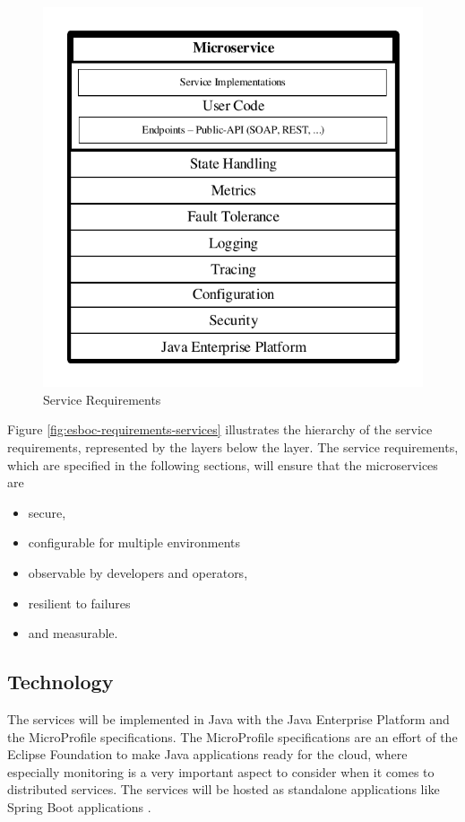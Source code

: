 \begin{figure}[htbp]
	\centering
	\includegraphics[scale=1]{images/esboc-requirement-services.pdf}
	\caption{Service Requirements}
	\label{fig:esboc-requirements-services}
\end{figure} 
Figure \vref{fig:esboc-requirements-services} illustrates the hierarchy of the service requirements, represented by the layers below the  layer. The service requirements, which are specified in the following sections, will ensure that the microservices are
\begin{itemize}
	\item secure,
	\item configurable for multiple environments
	\item observable by developers and operators,
	\item resilient to failures
	\item and measurable.
\end{itemize}

\subsection{Technology}
\label{sec:esboc-requirements-service-technology}
The services will be implemented in Java with the Java Enterprise Platform and the MicroProfile specifications. The MicroProfile specifications are an effort of the Eclipse Foundation to make Java applications ready for the cloud, where especially monitoring is a very important aspect to consider when it comes to distributed services. The services will be hosted as standalone applications like Spring Boot applications \cite{EclipseMicroprofileCharter2017, EclipseEE4JCharter2017}.

